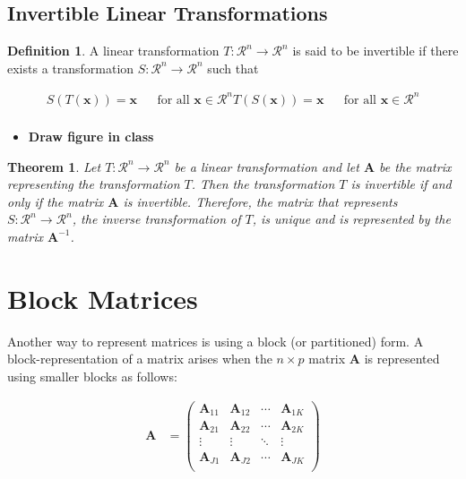 \documentclass[
]{book}
\providecommand{\tightlist}{%
  \setlength{\itemsep}{0pt}\setlength{\parskip}{0pt}}
\newtheorem{theorem}{Theorem}[chapter]
\theoremstyle{definition}
\newtheorem{definition}{Definition}[chapter]
\theoremstyle{definition}
\theoremstyle{definition}
\theoremstyle{definition}
\theoremstyle{remark}
\begin{document}
\hypertarget{invertible-linear-transformations}{%
\section{Invertible Linear Transformations}\label{invertible-linear-transformations}}

\begin{definition}
A linear transformation \(T:\mathcal{R}^n \rightarrow \mathcal{R}^n\) is said to be invertible if there exists a transformation \(S:\mathcal{R}^n \rightarrow \mathcal{R}^n\) such that

\[
\begin{aligned}
S(T(\mathbf{x})) = \mathbf{x} && \mbox{for all } \mathbf{x} \in \mathcal{R}^n
T(S(\mathbf{x})) = \mathbf{x} && \mbox{for all } \mathbf{x} \in \mathcal{R}^n \\
\end{aligned}
\]
\end{definition}

\begin{itemize}
\tightlist
\item
  \textbf{Draw figure in class}
\end{itemize}

\begin{theorem}
Let \(T:\mathcal{R}^n \rightarrow \mathcal{R}^n\) be a linear transformation and let \(\mathbf{A}\) be the matrix representing the transformation \(T\). Then the transformation \(T\) is invertible if and only if the matrix \(\mathbf{A}\) is invertible. Therefore, the matrix that represents \(S:\mathcal{R}^n \rightarrow \mathcal{R}^n\), the inverse transformation of \(T\), is unique and is represented by the matrix \(\mathbf{A}^{-1}\).
\end{theorem}

\hypertarget{block-matrices}{%
\chapter{Block Matrices}\label{block-matrices}}

Another way to represent matrices is using a block (or partitioned) form. A block-representation of a matrix arises when the \(n \times p\) matrix \(\mathbf{A}\) is represented using smaller blocks as follows:

\[
\begin{aligned}
\mathbf{A} & = \begin{pmatrix} \mathbf{A}_{11} & \mathbf{A}_{12} & \cdots & \mathbf{A}_{1K} \\
\mathbf{A}_{21} & \mathbf{A}_{22} &  \cdots & \mathbf{A}_{2K} \\
\vdots & \vdots & \ddots & \vdots \\
\mathbf{A}_{J1} & \mathbf{A}_{J2} & \cdots & \mathbf{A}_{JK} \\
\end{pmatrix} \\
\end{aligned}
\]
\end{document}
